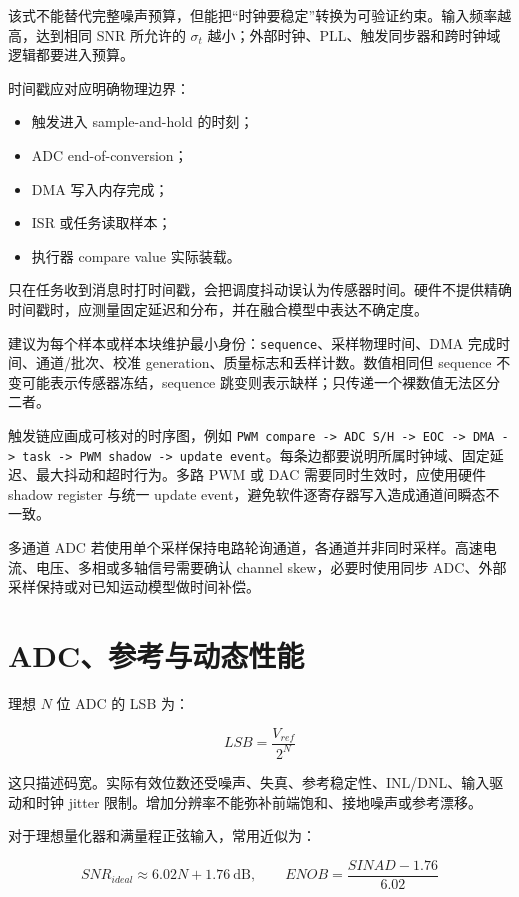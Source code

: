 该式不能替代完整噪声预算，但能把“时钟要稳定”转换为可验证约束。输入频率越高，达到相同 SNR 所允许的 $\sigma_t$ 越小；外部时钟、PLL、触发同步器和跨时钟域逻辑都要进入预算。

时间戳应对应明确物理边界：

\begin{itemize}
  \item 触发进入 sample-and-hold 的时刻；
  \item ADC end-of-conversion；
  \item DMA 写入内存完成；
  \item ISR 或任务读取样本；
  \item 执行器 compare value 实际装载。
\end{itemize}

只在任务收到消息时打时间戳，会把调度抖动误认为传感器时间。硬件不提供精确时间戳时，应测量固定延迟和分布，并在融合模型中表达不确定度。

建议为每个样本或样本块维护最小身份：\texttt{sequence}、采样物理时间、DMA 完成时间、通道/批次、校准 generation、质量标志和丢样计数。数值相同但 sequence 不变可能表示传感器冻结，sequence 跳变则表示缺样；只传递一个裸数值无法区分二者。

触发链应画成可核对的时序图，例如 \texttt{PWM compare -> ADC S/H -> EOC -> DMA -> task -> PWM shadow -> update event}。每条边都要说明所属时钟域、固定延迟、最大抖动和超时行为。多路 PWM 或 DAC 需要同时生效时，应使用硬件 shadow register 与统一 update event，避免软件逐寄存器写入造成通道间瞬态不一致。

多通道 ADC 若使用单个采样保持电路轮询通道，各通道并非同时采样。高速电流、电压、多相或多轴信号需要确认 channel skew，必要时使用同步 ADC、外部采样保持或对已知运动模型做时间补偿。

\section{ADC、参考与动态性能}

理想 $N$ 位 ADC 的 LSB 为：

\begin{equation}
  LSB=\frac{V_{ref}}{2^N}
\end{equation}

这只描述码宽。实际有效位数还受噪声、失真、参考稳定性、INL/DNL、输入驱动和时钟 jitter 限制。增加分辨率不能弥补前端饱和、接地噪声或参考漂移。

对于理想量化器和满量程正弦输入，常用近似为：

\begin{equation}
  SNR_{ideal}\approx 6.02N+1.76\ \mathrm{dB},\qquad
  ENOB=\frac{SINAD-1.76}{6.02}
\end{equation}

